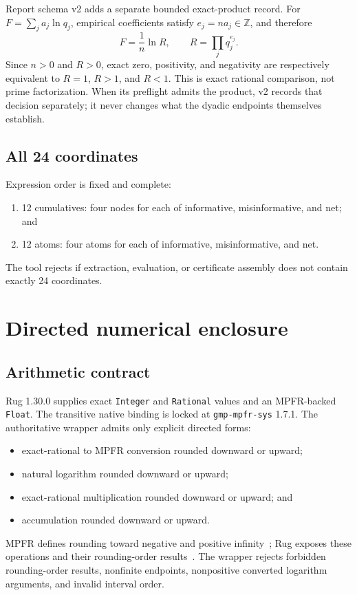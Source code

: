 \documentclass[11pt]{article}
\theoremstyle{definition}
\begin{document}
Report schema v2 adds a separate bounded exact-product record.  For
$F=\sum_j a_j\ln q_j$, empirical coefficients satisfy $e_j=na_j\in\mathbb Z$, and therefore
\begin{equation}\label{eq:exact-product-sign}
  F=\frac1n\ln R,
  \qquad R=\prod_jq_j^{e_j}.
\end{equation}
Since $n>0$ and $R>0$, exact zero, positivity, and negativity are respectively equivalent to
$R=1$, $R>1$, and $R<1$.  This is exact rational comparison, not prime factorization.  When its
preflight admits the product, v2 records that decision separately; it never changes what the
dyadic endpoints themselves establish.

\subsection{All 24 coordinates}

Expression order is fixed and complete:
\begin{enumerate}[leftmargin=*]
  \item 12 cumulatives: four nodes for each of informative, misinformative, and net; and
  \item 12 atoms: four atoms for each of informative, misinformative, and net.
\end{enumerate}
The tool rejects if extraction, evaluation, or certificate assembly does not contain exactly 24
coordinates.

\section{Directed numerical enclosure}

\subsection{Arithmetic contract}

Rug 1.30.0 supplies exact \texttt{Integer} and \texttt{Rational} values and an MPFR-backed
\texttt{Float}.  The transitive native binding is locked at \texttt{gmp-mpfr-sys} 1.7.1.  The
authoritative wrapper admits only explicit directed forms:
\begin{itemize}[leftmargin=*]
  \item exact-rational to MPFR conversion rounded downward or upward;
  \item natural logarithm rounded downward or upward;
  \item exact-rational multiplication rounded downward or upward; and
  \item accumulation rounded downward or upward.
\end{itemize}
MPFR defines rounding toward negative and positive infinity~\cite{mpfr-manual}; Rug exposes these
operations and their rounding-order results~\cite{rug-docs}.  The wrapper rejects forbidden
rounding-order results, nonfinite endpoints, nonpositive converted logarithm arguments, and
invalid interval order.
\end{document}
